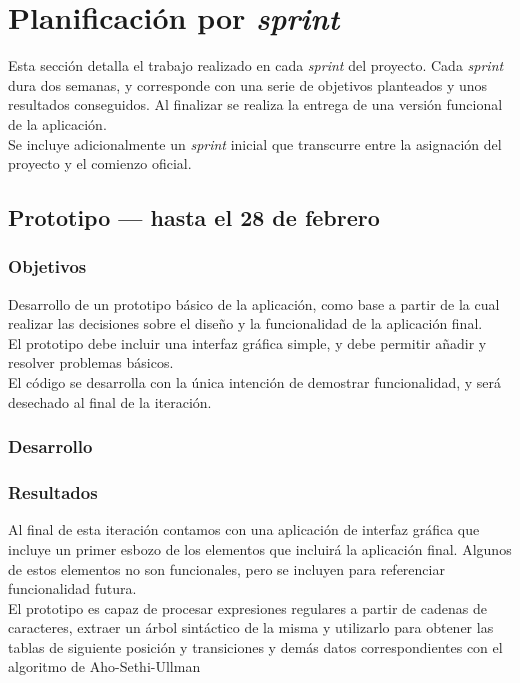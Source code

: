 
\section{Planificación por \emph{sprint}}
Esta sección detalla el trabajo realizado en cada \emph{sprint} del proyecto. Cada \emph{sprint} dura dos semanas, y corresponde con una serie de objetivos planteados y unos resultados conseguidos.
Al finalizar se realiza la entrega de una versión funcional de la aplicación.
\\
Se incluye adicionalmente un \emph{sprint} inicial que transcurre entre la asignación del proyecto y el comienzo oficial.

\subsection{Prototipo --- hasta el 28 de febrero}

\subsubsection{Objetivos}
Desarrollo de un prototipo básico de la aplicación, como base a partir de la cual realizar las decisiones sobre el diseño y la funcionalidad de la aplicación final.
\\
El prototipo debe incluir una interfaz gráfica simple, y debe permitir añadir y resolver problemas básicos. \\
El código se desarrolla con la única intención de demostrar funcionalidad, y será desechado al final de la iteración.

\subsubsection{Desarrollo}

\subsubsection{Resultados}
Al final de esta iteración contamos con una aplicación de interfaz gráfica que incluye un primer esbozo de los elementos que incluirá la aplicación final.
Algunos de estos elementos no son funcionales, pero se incluyen para referenciar funcionalidad futura.
\\
El prototipo es capaz de procesar expresiones regulares a partir de cadenas de caracteres, extraer un árbol sintáctico de la misma y utilizarlo para obtener las tablas de siguiente posición y transiciones y demás datos correspondientes con el algoritmo de Aho-Sethi-Ullman

